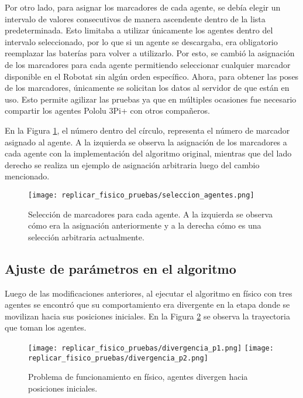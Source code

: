 Por otro lado, para asignar los marcadores de cada agente, se debía elegir un intervalo  de valores consecutivos de manera ascendente dentro de la lista predeterminada. Esto limitaba a utilizar únicamente los agentes dentro del intervalo seleccionado, por lo que si un agente se descargaba, era obligatorio reemplazar las baterías para volver a utilizarlo. Por esto, se cambió la asignación de los marcadores para cada agente permitiendo seleccionar cualquier marcador disponible en el Robotat sin algún orden específico. Ahora, para obtener las poses de los marcadores, únicamente se solicitan los datos al servidor de que están en uso. Esto permite agilizar las pruebas ya que en múltiples ocasiones fue necesario compartir los agentes Pololu 3Pi+ con otros compañeros.

En la Figura \ref{fig:seleccion_agentes}, el número dentro del círculo, representa el número de marcador asignado al agente. A la izquierda se observa la asignación de los marcadores a cada agente con la implementación del algoritmo original, mientras que del lado derecho se realiza un ejemplo de asignación arbitraria luego del cambio mencionado.

\begin{figure}[H]
	\centering
	\texttt{[image: replicar\_fisico\_pruebas/seleccion\_agentes.png]}
	\caption{Selección de marcadores para cada agente. A la izquierda se observa cómo era la asignación anteriormente y a la derecha cómo es una selección arbitraria actualmente.}
	\label{fig:seleccion_agentes}
\end{figure}


\subsection{Ajuste de parámetros en el algoritmo}
Luego de las modificaciones anteriores, al ejecutar el algoritmo en físico con tres agentes se encontró que su comportamiento era divergente en la etapa donde se movilizan hacia sus posiciones iniciales. En la Figura \ref{fig:divergencia1} se observa la trayectoria que toman los agentes.

\begin{figure}[H]
	\centering
	\texttt{[image: replicar\_fisico\_pruebas/divergencia\_p1.png]}
	\texttt{[image: replicar\_fisico\_pruebas/divergencia\_p2.png]}
	\caption{Problema de funcionamiento en físico, agentes divergen hacia posiciones iniciales. }
	\label{fig:divergencia1}
\end{figure}

